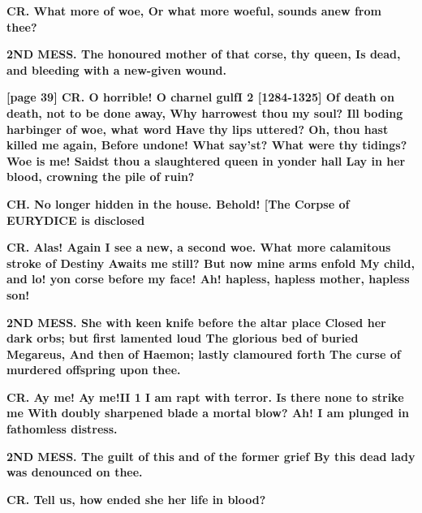 \documentclass[11pt,letter]{book}
\begin{document}
\par \textbf{CR. What more of woe, Or what more woeful, sounds anew from thee?}
\par 

\par \textbf{2ND MESS. The honoured mother of that corse, thy queen, Is dead, and bleeding with a new-given wound.}
\par 

\par \textbf{[page 39] CR. O horrible! O charnel gulfI 2 [1284-1325] Of death on death, not to be done away, Why harrowest thou my soul? Ill boding harbinger of woe, what word Have thy lips uttered? Oh, thou hast killed me again, Before undone! What say’st? What were thy tidings? Woe is me! Saidst thou a slaughtered queen in yonder hall Lay in her blood, crowning the pile of ruin?}
\par 

\par \textbf{CH. No longer hidden in the house. Behold! [The Corpse of EURYDICE is disclosed}
\par 

\par \textbf{CR. Alas! Again I see a new, a second woe. What more calamitous stroke of Destiny Awaits me still? But now mine arms enfold My child, and lo! yon corse before my face! Ah! hapless, hapless mother, hapless son!}
\par 

\par \textbf{2ND MESS. She with keen knife before the altar place Closed her dark orbs; but first lamented loud The glorious bed of buried Megareus, And then of Haemon; lastly clamoured forth The curse of murdered offspring upon thee.}
\par 

\par \textbf{CR. Ay me! Ay me!II 1 I am rapt with terror. Is there none to strike me With doubly sharpened blade a mortal blow? Ah! I am plunged in fathomless distress.}
\par 

\par \textbf{2ND MESS. The guilt of this and of the former grief By this dead lady was denounced on thee.}
\par 

\par \textbf{CR. Tell us, how ended she her life in blood?}
\par 
\end{document}
